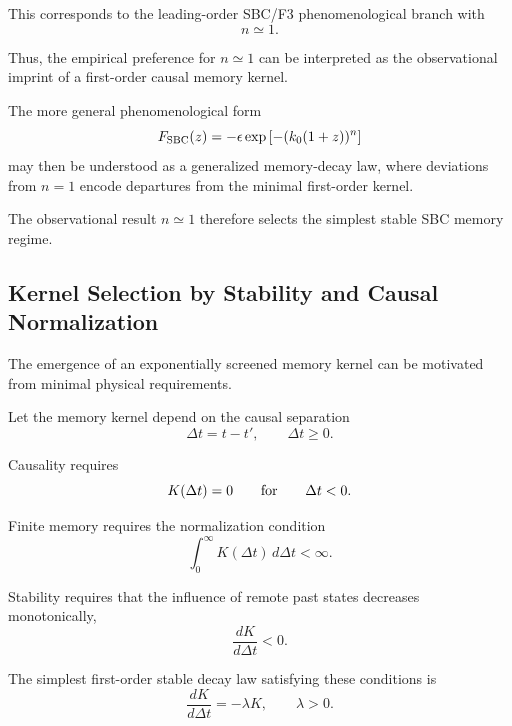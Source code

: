 This corresponds to the leading-order SBC/F3 phenomenological branch with
\begin{equation}
n\simeq 1.
\end{equation}

Thus, the empirical preference for \(n\simeq 1\) can be interpreted as the observational imprint of a first-order causal memory kernel.

The more general phenomenological form
\begin{equation}
F_{\rm SBC}(z)
=
-\epsilon
\exp\left[-(k_0(1+z))^n\right]
\end{equation}
may then be understood as a generalized memory-decay law, where deviations from \(n=1\) encode departures from the minimal first-order kernel.

The observational result \(n\simeq1\) therefore selects the simplest stable SBC memory regime.

\subsection{Kernel Selection by Stability and Causal Normalization}

The emergence of an exponentially screened memory kernel can be motivated from minimal physical requirements.

Let the memory kernel depend on the causal separation
\begin{equation}
\Delta t = t-t',
\qquad
\Delta t \geq 0 .
\end{equation}

Causality requires
\begin{equation}
K(\Delta t)=0
\qquad
{\rm for}
\qquad
\Delta t<0 .
\end{equation}

Finite memory requires the normalization condition
\begin{equation}
\int_0^\infty K(\Delta t)\,d\Delta t < \infty .
\end{equation}

Stability requires that the influence of remote past states decreases monotonically,
\begin{equation}
\frac{dK}{d\Delta t}<0 .
\end{equation}

The simplest first-order stable decay law satisfying these conditions is
\begin{equation}
\frac{dK}{d\Delta t}
=
-\lambda K,
\qquad
\lambda>0 .
\end{equation}

